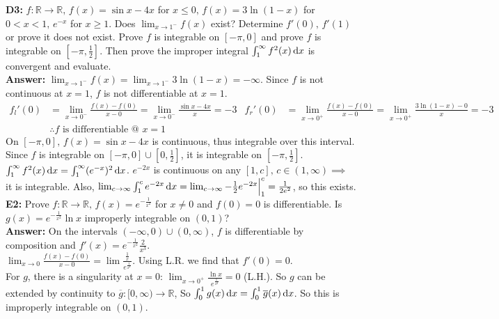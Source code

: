 \documentclass{article}
\begin{document}
        \noindent \textbf{D3: }$f:\mathbb{R} \to \mathbb{R}, \, f(x) = \sin x -4x$ for $x \leq 0, \, f(x) = 3\ln (1-x)$ for $0<x<1, \, e^{-x}$ for $x \geq 1$. Does $\lim_{x \to 1^-} f(x)$ exist? Determine $f'(0), \, f'(1)$ or prove it does not exist. Prove $f$ is integrable on $[-\pi, 0]$ and prove $f$ is integrable on $[-\pi, \frac{1}{2}]$. Then prove the improper integral $\int_1^\infty f^2(x) \dif x$ is convergent and evaluate.\\
        \textbf{Answer: }$\lim_{x \to 1^-} f(x) = \lim_{x \to 1^-} 3\ln (1-x) = -\infty$. Since $f$ is not continuous at $x=1$, $f$ is not differentiable at $x=1$.
        \begin{align*}
            f_l'(0) &= \lim_{x \to 0^-} \frac{f(x)-f(0)}{x-0} = \lim_{x \to 0^-} \frac{\sin x -4x}{x} = -3  &   f_r'(0) &= \lim_{x \to 0^+} \frac{f(x)-f(0)}{x-0} = \lim_{x \to 0^+} \frac{3\ln (1-x)-0}{x} = -3\\
            &\therefore \text{$f$ is differentiable @ $x=1$}
        \end{align*}
        On $[-\pi, 0], \, f(x)=\sin x -4x$ is continuous, thus integrable over this interval. Since $f$ is integrable on $[-\pi, 0] \cup [0, \frac{1}{2}]$, it is integrable on $[-\pi, \frac{1}{2}]$.\\
        $\int_1^\infty f^2(x) \dif x = \int_1^\infty (e^{-x})^2 \dif x$. $e^{-2x}$ is continuous on any $[1,c], \, c \in (1, \infty) \implies$ it is integrable. Also, $\lim_{c \to \infty} \int_1^c e^{-2x} \dif x = \lim_{c \to \infty} -\frac{1}{2}e^{-2x}\Big|_1^c = \frac{1}{2e^2}$, so this exists.\\
        
        \noindent \textbf{E2: }Prove $f:\mathbb{R} \to \mathbb{R}, \, f(x) = e^{-\frac{1}{x^2}}$ for $x \neq 0$ and $f(0) = 0$ is differentiable. Is $g(x) = e^{-\frac{1}{x^2}} \ln x$ improperly integrable on $(0,1)$?\\
        \textbf{Answer: }On the intervals $(-\infty, 0) \cup (0, \infty)$, $f$ is differentiable by composition and $f'(x) = e^{-\frac{1}{x^2}}\frac{2}{x^3}$.\\
        $\lim_{x \to 0} \frac{f(x)-f(0)}{x-0} = \lim \frac{\frac{1}{x}}{e^\frac{1}{x^2}}$. Using L.R. we find that $f'(0) = 0$.\\
        For $g$, there is a singularity at $x=0$: $\lim_{x \to 0^+} \frac{\ln x}{e^{\frac{1}{x^2}}} = 0$ (L.H.). So $g$ can be extended by continuity to $\overline{g}:[0,\infty) \to \mathbb{R}$, So $\int_0^1 g(x) \dif x = \int_0^1 \overline{g}(x) \dif x$. So this is improperly integrable on $(0,1)$.\\
        
\end{document}
